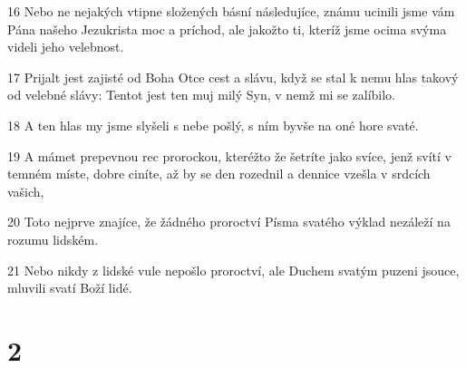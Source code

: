 \par 16 Nebo ne nejakých vtipne složených básní následujíce, známu ucinili jsme vám Pána našeho Jezukrista moc a príchod, ale jakožto ti, kteríž jsme ocima svýma videli jeho velebnost.
\par 17 Prijalt jest zajisté od Boha Otce cest a slávu, když se stal k nemu hlas takový od velebné slávy: Tentot jest ten muj milý Syn, v nemž mi se zalíbilo.
\par 18 A ten hlas my jsme slyšeli s nebe pošlý, s ním byvše na oné hore svaté.
\par 19 A mámet prepevnou rec prorockou, kteréžto že šetríte jako svíce, jenž svítí v temném míste, dobre ciníte, až by se den rozednil a dennice vzešla v srdcích vašich,
\par 20 Toto nejprve znajíce, že žádného proroctví Písma svatého výklad nezáleží na rozumu lidském.
\par 21 Nebo nikdy z lidské vule nepošlo proroctví, ale Duchem svatým puzeni jsouce, mluvili svatí Boží lidé.

\chapter{2}


